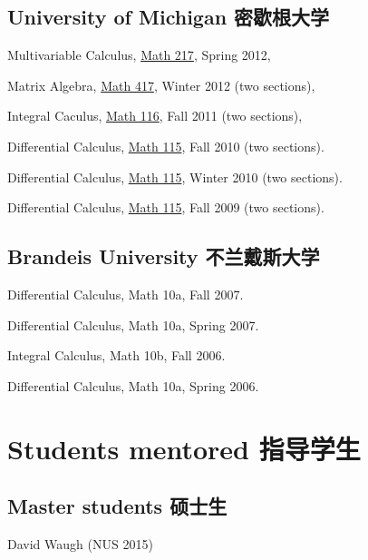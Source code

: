 \documentclass[12pt,a4paper]{article}
\newenvironment{item_list}{
 \begin{list}{}{
   \setlength{\leftmargin}{1.5em}
   \setlength{\itemsep}{0.25em}
   \setlength{\parskip}{0pt}
   \setlength{\parsep}{0.25em}
 }
}{
 \end{list}
}
\begin{document}
\subsection*{University of Michigan 密歇根大学}

\begin{item_list}
\item Multivariable Calculus, \href{http://instruct.math.lsa.umich.edu/}{Math 217}, Spring 2012,
\item Matrix Algebra, \href{http://www.math.lsa.umich.edu/courses/undergrad.html#417}{Math 417}, Winter 2012 (two sections),
\item Integral Caculus, \href{http://www.math.lsa.umich.edu/courses/116/}{Math 116}, Fall 2011 (two sections),
\item Differential Calculus, \href{http://www.math.lsa.umich.edu/courses/115/}{Math 115}, Fall 2010 (two sections). 
\item Differential Calculus, \href{http://www.math.lsa.umich.edu/courses/115/}{Math 115}, Winter 2010 (two sections). 
\item Differential Calculus, \href{http://www.math.lsa.umich.edu/courses/115/}{Math 115}, Fall 2009 (two sections).
\end{item_list}

\subsection*{Brandeis University 不兰戴斯大学}

\begin{item_list}
\item Differential Calculus, Math 10a,
  Fall 2007. 
\item Differential Calculus, Math 10a,
  Spring 2007. 
\item Integral Calculus, Math 10b,
  Fall 2006.
\item Differential Calculus, Math 10a,
  Spring 2006.
\end{item_list}

\section*{Students mentored 指导学生}

\subsection*{Master students 硕士生}

David Waugh (NUS 2015)
\end{document}
